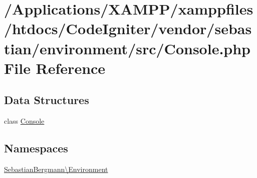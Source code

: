 \hypertarget{_console_8php}{}\section{/\+Applications/\+X\+A\+M\+P\+P/xamppfiles/htdocs/\+Code\+Igniter/vendor/sebastian/environment/src/\+Console.php File Reference}
\label{_console_8php}
\subsection*{Data Structures}
\begin{DoxyCompactItemize}
\item 
class \mbox{\hyperlink{class_sebastian_bergmann_1_1_environment_1_1_console}{Console}}
\end{DoxyCompactItemize}
\subsection*{Namespaces}
\begin{DoxyCompactItemize}
\item 
 \mbox{\hyperlink{namespace_sebastian_bergmann_1_1_environment}{Sebastian\+Bergmann\textbackslash{}\+Environment}}
\end{DoxyCompactItemize}
